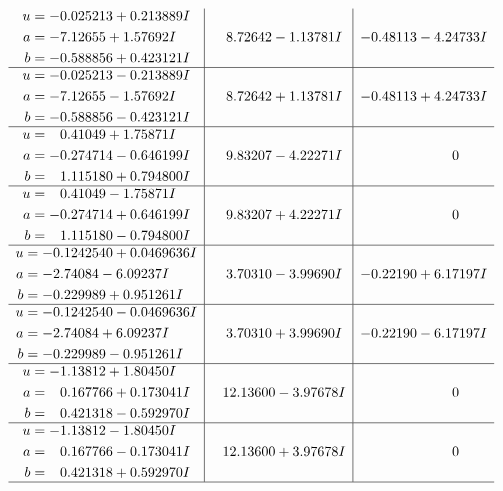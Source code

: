 \documentclass[1p]{elsarticle_modified}
\theoremstyle{definition}
\begin{document}
$$\begin{array}{c|c|c}
\begin{aligned}
u &= -0.025213 + 0.213889 I \\
a &= -7.12655 + 1.57692 I \\
b &= -0.588856 + 0.423121 I\end{aligned}
 & \phantom{-}8.72642 - 1.13781 I & -0.48113 - 4.24733 I \\ \hline\begin{aligned}
u &= -0.025213 - 0.213889 I \\
a &= -7.12655 - 1.57692 I \\
b &= -0.588856 - 0.423121 I\end{aligned}
 & \phantom{-}8.72642 + 1.13781 I & -0.48113 + 4.24733 I \\ \hline\begin{aligned}
u &= \phantom{-}0.41049 + 1.75871 I \\
a &= -0.274714 - 0.646199 I \\
b &= \phantom{-}1.115180 + 0.794800 I\end{aligned}
 & \phantom{-}9.83207 - 4.22271 I & \phantom{-0.000000 } 0 \\ \hline\begin{aligned}
u &= \phantom{-}0.41049 - 1.75871 I \\
a &= -0.274714 + 0.646199 I \\
b &= \phantom{-}1.115180 - 0.794800 I\end{aligned}
 & \phantom{-}9.83207 + 4.22271 I & \phantom{-0.000000 } 0 \\ \hline\begin{aligned}
u &= -0.1242540 + 0.0469636 I \\
a &= -2.74084 - 6.09237 I \\
b &= -0.229989 + 0.951261 I\end{aligned}
 & \phantom{-}3.70310 - 3.99690 I & -0.22190 + 6.17197 I \\ \hline\begin{aligned}
u &= -0.1242540 - 0.0469636 I \\
a &= -2.74084 + 6.09237 I \\
b &= -0.229989 - 0.951261 I\end{aligned}
 & \phantom{-}3.70310 + 3.99690 I & -0.22190 - 6.17197 I \\ \hline\begin{aligned}
u &= -1.13812 + 1.80450 I \\
a &= \phantom{-}0.167766 + 0.173041 I \\
b &= \phantom{-}0.421318 - 0.592970 I\end{aligned}
 & \phantom{-}12.13600 - 3.97678 I & \phantom{-0.000000 } 0 \\ \hline\begin{aligned}
u &= -1.13812 - 1.80450 I \\
a &= \phantom{-}0.167766 - 0.173041 I \\
b &= \phantom{-}0.421318 + 0.592970 I\end{aligned}
 & \phantom{-}12.13600 + 3.97678 I & \phantom{-0.000000 } 0\\
 \hline 
 \end{array}$$\newpage\newpage\renewcommand{\arraystretch}{1}
\end{document}
